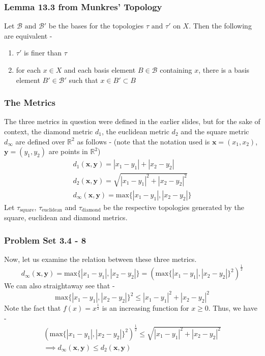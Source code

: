 \begin{frame}
    \frametitle{Lemma 13.3 from Munkres' Topology}
    Let $\mathcal{B} \text{ and } \mathcal{B}'$ be the bases for the topologies $\tau \text{ and } \tau'$ on $X$. Then the following are equivalent -
    \begin{enumerate}
        \item $\tau'$ is finer than $\tau$
        \item for each $x \in X$ and each basis element $B \in \mathcal{B}$ containing $x$, there is a basis element $B' \in \mathcal{B}'$ such that $x \in B' \subset B$
    \end{enumerate}
\end{frame}

\begin{frame}
    \frametitle{The Metrics}
    The three metrics in question were defined in the earlier slides, but for the sake of context, the diamond metric $d_1$, the euclidean metric $d_2$ and the square metric $d_\infty$ are defined over $\mathbb{R}^2$ as follows - (note that the notation used is $\boldsymbol{x} = (x_1, x_2)$, $\boldsymbol{y} = (y_1, y_2)$ are points in $\mathbb{R}^2$)
    \begin{gather*}
        d_1(\boldsymbol{x}, \boldsymbol{y}) = |x_1 - y_1| + |x_2 - y_2| \\
        d_2(\boldsymbol{x}, \boldsymbol{y}) = \sqrt{|x_1 - y_1|^2 + |x_2 - y_2|^2} \\
        d_\infty(\boldsymbol{x}, \boldsymbol{y}) = \text{max} \{|x_1 - y_1|, |x_2 - y_2|\}
    \end{gather*}
    Let $\tau_{\text{square}}$, $\tau_{\text{euclidean}}$ and $\tau_{\text{diamond}}$ be the respective topologies generated by the square, euclidean and diamond metrics.
\end{frame}

\begin{frame}
    \frametitle{Problem Set 3.4 - 8}
    Now, let us examine the relation between these three metrics.
    \begin{equation*}
        d_\infty(\boldsymbol{x}, \boldsymbol{y}) = \text{max} \{|x_1 - y_1|, |x_2 - y_2|\} = \left(\text{max} \{|x_1 - y_1|, |x_2 - y_2|\}^2 \right)^{\frac{1}{2}}
    \end{equation*}
    \pause
    We can also straightaway see that -
    \begin{equation*}
        \text{max} \{|x_1 - y_1|, |x_2 - y_2|\}^2 \leq |x_1 - y_1|^2 + |x_2 - y_2|^2
    \end{equation*}
    \pause
    Note the fact that $f(x) = x^{\frac{1}{2}}$ is an increasing function for $x \geq 0$. Thus, we have -
    \begin{gather*}
        \left(\text{max} \{|x_1 - y_1|, |x_2 - y_2|\}^2 \right)^{\frac{1}{2}} \leq \sqrt{|x_1 - y_1|^2 + |x_2 - y_2|^2} \\
        \implies d_\infty(\boldsymbol{x}, \boldsymbol{y}) \leq d_2(\boldsymbol{x}, \boldsymbol{y})
    \end{gather*} 
\end{frame}

